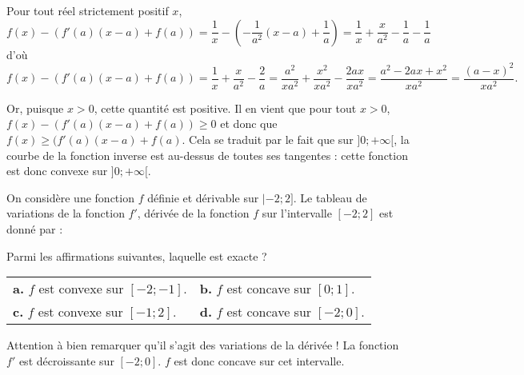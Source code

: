 \documentclass[11pt,fleqn, openany]{book} %
\begin{document}
\begin{solution}
Pour tout réel strictement positif \(x\),
\[f(x)-(f'(a)(x-a)+f(a))  = \dfrac{1}{x} - \left( -\dfrac{1}{a^2}(x-a)+\dfrac{1}{a}\right) = \dfrac{1}{x}+ \dfrac{x}{a^2} - \dfrac{1}{a} -\dfrac{1}{a}\]
d'où 
\[f(x)-(f'(a)(x-a)+f(a)) = \dfrac{1}{x} + \dfrac{x}{a^2}-\dfrac{2}{a} =\dfrac{a^2}{xa^2}+\dfrac{x^2}{xa^2} - \dfrac{2ax}{xa^2} = \dfrac{a^2-2ax+x^2}{xa^2}= \dfrac{(a-x)^2}{xa^2} .\]

Or, puisque \(x > 0\), cette quantité est positive. Il en vient que pour tout \(x>0\), \(f(x)-(f'(a)(x-a)+f(a)) \geqslant 0\) et donc que \(f(x)\geqslant (f'(a)(x-a)+f(a) \). Cela se traduit par le fait que sur \(]0;+\infty[\), la courbe de la fonction inverse est au-dessus de toutes ses tangentes : cette fonction est donc convexe sur \(]0;+\infty[\).\end{solution}

\begin{exercise}[subtitle={(Polynésie 2022)}]

On considère une fonction $f$ définie et dérivable sur $|-2;2]$. Le tableau de variations de la fonction $f'$, dérivée de la fonction $f$ sur l'intervalle $[-2;2]$ est donné par :
\begin{center}
\end{center}

Parmi les affirmations suivantes, laquelle est exacte ?

\begin{tabularx}{\linewidth}{XX}
\textbf{a.} $f$ est convexe sur $[-2;-1]$. & \textbf{b.} $f$ est concave sur $[0;1]$. \\
\textbf{c.} $f$ est convexe sur $[-1;2]$. & \textbf{d.} $f$ est concave sur $[-2;0]$.
\end{tabularx}\end{exercise}

\begin{solution}Attention à bien remarquer qu'il s'agit des variations de la dérivée ! La fonction $f'$ est décroissante sur $[-2;0]$. $f$ est donc concave sur cet intervalle.\end{solution}
\end{document}
